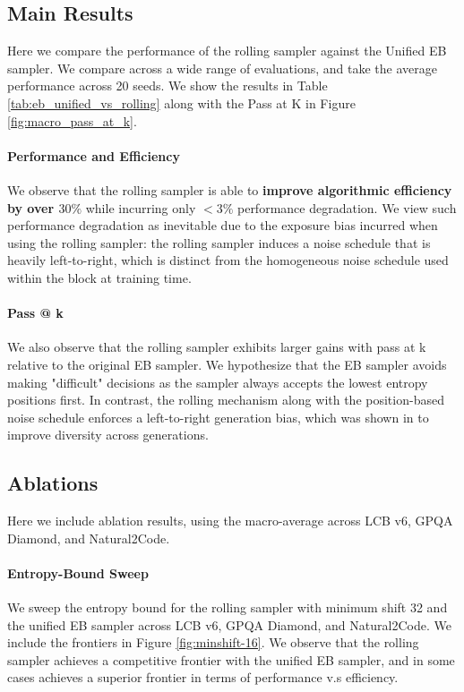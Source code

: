 \subsection{Main Results}
Here we compare the performance of the rolling sampler against the Unified EB sampler. We compare across a wide range of evaluations, and take the average performance across 20 seeds. 
We show the results in Table \ref{tab:eb_unified_vs_rolling} along with the Pass at K in Figure \ref{fig:macro_pass_at_k}.

\paragraph{Performance and Efficiency}
We observe that the rolling sampler is able to \textbf{improve algorithmic efficiency by over $30\%$} while incurring only $<3\%$ performance degradation.
We view such performance degradation as inevitable due to the exposure bias incurred when using the rolling sampler: the rolling sampler induces a noise schedule that is heavily left-to-right, which is distinct from the homogeneous noise schedule used within the block at training time.

\paragraph{Pass @ k}
We also observe that the rolling sampler exhibits larger gains with pass at k relative to the original EB sampler.
We hypothesize that the EB sampler avoids making "difficult" decisions as the sampler always accepts the lowest entropy positions first.
In contrast, the rolling mechanism along with the position-based noise schedule enforces a left-to-right generation bias, which was shown in \citet{ni2026flexibility} to improve diversity across generations. 



\subsection{Ablations}
Here we include ablation results, using the macro-average across LCB v6, GPQA Diamond, and Natural2Code.



\paragraph{Entropy-Bound Sweep}
We sweep the entropy bound for the rolling sampler with minimum shift 32 and the unified EB sampler across LCB v6, GPQA Diamond, and Natural2Code.
We include the frontiers in Figure \ref{fig:minshift-16}.
We observe that the rolling sampler achieves a competitive frontier with the unified EB sampler, and in some cases achieves a superior frontier in terms of performance v.s efficiency. 

